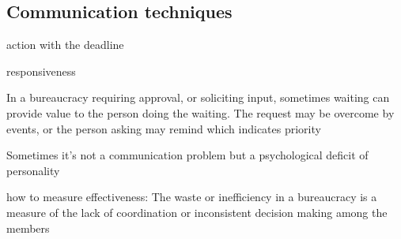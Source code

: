 \subsection{Communication techniques}

action with the deadline

responsiveness

In a bureaucracy requiring approval, or soliciting input, sometimes waiting can provide value to the person doing the waiting. The request may be overcome by events, or the person asking may remind which indicates priority

Sometimes it's not a communication problem but a psychological deficit of personality

how to measure effectiveness: The waste or inefficiency in a bureaucracy is a measure of the lack of coordination or inconsistent decision making among the members